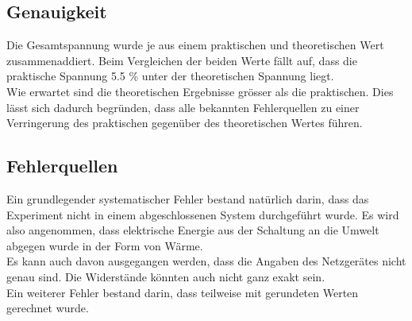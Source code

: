 \documentclass[a4paper,12pt]{article}
\begin{document}
\subsection{Genauigkeit}

Die Gesamtspannung wurde je aus einem praktischen und theoretischen Wert zusammenaddiert. Beim Vergleichen der beiden Werte fällt auf, dass die praktische Spannung 5.5 \% unter der theoretischen Spannung liegt.\\

Wie erwartet sind die theoretischen Ergebnisse grösser als die praktischen. Dies lässt sich dadurch begründen, dass alle bekannten Fehlerquellen zu einer Verringerung des praktischen gegenüber des theoretischen Wertes führen.





\subsection{Fehlerquellen}

Ein grundlegender systematischer Fehler bestand natürlich darin, dass das Experiment nicht in einem abgeschlossenen System durchgeführt wurde. Es wird also angenommen, dass elektrische Energie aus der Schaltung an die Umwelt abgegen wurde in der Form von Wärme.\\

Es kann auch davon ausgegangen werden, dass die Angaben des Netzgerätes nicht genau sind. Die Widerstände könnten auch nicht ganz exakt sein.\\

Ein weiterer Fehler bestand darin, dass teilweise mit gerundeten Werten gerechnet wurde.\\

\end{document}
